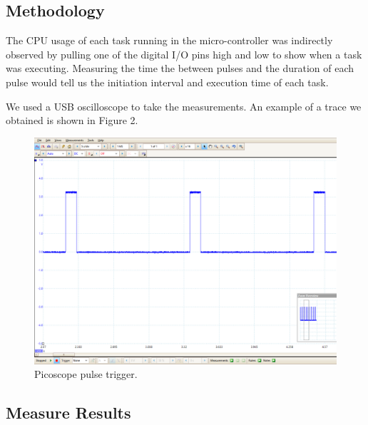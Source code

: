 \documentclass{article}
\begin{document}
\subsection{Methodology}

\noindent
The CPU usage of each task running in the micro-controller was indirectly observed by pulling one of the digital I/O pins high and low to show when a task was executing. Measuring the time the between pulses and the duration of each pulse would tell us the initiation interval and execution time of each task.

\bigskip

\noindent
We used a USB oscilloscope to take the measurements. An example of a trace we obtained is shown in Figure 2.

\begin{figure}[H]
\begin{center}
   \includegraphics[width=0.9\linewidth]{ScopeOutput.png}
\end{center}
   \caption{Picoscope pulse trigger.}
\label{fig:long}
\label{fig:onecol}
\end{figure}


\subsection{Measure Results}
\end{document}
